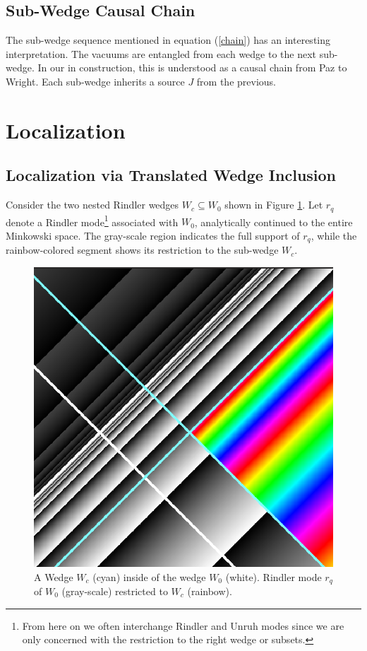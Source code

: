 \documentclass[12pt,a4paper]{article}
\begin{document}
\subsection{Sub-Wedge Causal Chain} \label{sec:chain_sources}

The sub-wedge sequence mentioned in equation (\ref{chain}) has an interesting interpretation.  The vacuums are entangled from each wedge to the next sub-wedge. In our in construction, this is understood as a causal chain from Paz to Wright.  Each sub-wedge inherits a source $J$ from the previous. 

\section{Localization} \label{sec:loc}
\subsection{Localization via Translated Wedge Inclusion}

Consider the two nested Rindler wedges $W_c \subseteq W_0$ shown in Figure \ref{restrict}. Let $r_q$ denote a Rindler mode\footnote{From here on we often interchange Rindler and Unruh modes since we are only concerned with the restriction to the right wedge or subsets.} associated with $W_0$, analytically continued to the entire Minkowski space. The gray-scale region indicates the full support of $r_q$, while the rainbow-colored segment shows its restriction to the sub-wedge $W_c$.

\begin{figure}[h]
  \centering
\includegraphics[scale=0.4]{wedge_in_wedge.png}
\caption{A Wedge $W_c$ (cyan) inside of the wedge $W_0$ (white). Rindler mode $r_q$ of $W_0$ (gray-scale) restricted to $W_c$ (rainbow).}
\label{restrict}
\end{figure}
\end{document}

